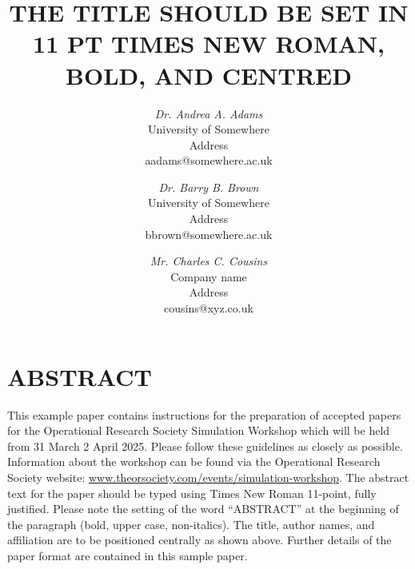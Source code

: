 \documentclass{swpaperproc}
\theoremstyle{sw}
\begin{document}


%
%

\title{THE TITLE SHOULD BE SET IN 11 PT TIMES NEW ROMAN, BOLD, AND CENTRED}

\author{\textit{Dr. Andrea A. Adams}\\ [11pt]
University of Somewhere\\
Address\\
aadams@somewhere.ac.uk\\
\and
\textit{Dr. Barry B. Brown}\\[11pt]
University of Somewhere\\
Address\\
bbrown@somewhere.ac.uk\\
\and
\textit{Mr. Charles C. Cousins}\\ [11pt]
Company name\\
Address\\
cousins@xyz.co.uk\\
}

\maketitle

\section*{ABSTRACT}
This example paper contains instructions for the preparation of accepted papers for the Operational Research Society Simulation Workshop which will be held from 31 March \text{-} 2 April 2025. Please follow these guidelines as closely as possible. Information about the workshop can be found via the Operational Research Society website: \href{https://www.theorsociety.com/ORS/Events/2025/Simulation-Workshop/SW25-Main.aspx?EventKey=SW25&WebsiteKey=c1745213-aec0-45e5-a960-0ec98ebabd4e}{www.theorsociety.com/events/simulation-workshop}. The abstract text for the paper should be typed using Times New Roman 11-point, fully justified. Please note the setting of the word ``ABSTRACT'' at the beginning of the paragraph (bold, upper case, non-italics). The title, author names, and affiliation are to be positioned centrally as shown above. Further details of the paper format are contained in this sample paper. 
\end{document}
